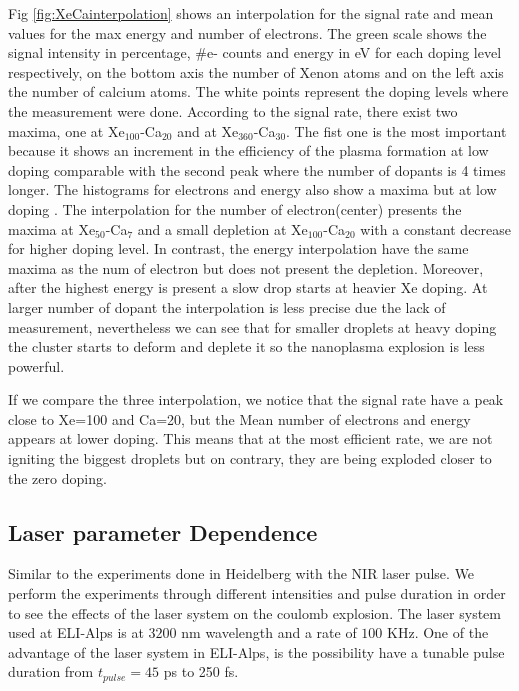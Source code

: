 Fig \ref{fig:XeCainterpolation} shows an interpolation for the signal rate and mean values for the max energy and number of electrons. The green scale shows the signal intensity in percentage, $\#$e- counts and  energy in eV for each doping level respectively, on the bottom axis  the number of Xenon atoms and on the left axis the number of calcium atoms. The white points represent the doping levels where the measurement were done. According to the signal rate, there exist two maxima, one at Xe$_{100}$-Ca$_{20}$ and at Xe$_{360}$-Ca$_{30}$. The fist one is the most important because it shows an increment in the efficiency of the plasma formation at low doping comparable with the second peak where the number of dopants is 4 times longer. The histograms for electrons and energy also show a maxima but at low doping . The interpolation for the number of electron(center) presents the maxima at Xe$_{50}$-Ca$_{7}$ and a small depletion at  Xe$_{100}$-Ca$_{20}$ with a constant decrease for higher doping level. In contrast, the energy interpolation have the same maxima as the num of electron but does not present the depletion. Moreover, after the highest energy is present  a slow drop starts at  heavier Xe doping. At larger number of dopant the interpolation is less precise due the lack of measurement, nevertheless we can see that  for smaller droplets at heavy doping the cluster starts to deform and deplete it so the nanoplasma explosion is  less powerful.

If we compare the three interpolation, we notice that the signal rate have a peak close to Xe=100 and Ca=20, but the Mean number of electrons and energy appears at lower doping. This means that at the most efficient rate, we are not igniting the biggest droplets but on contrary, they are being exploded closer to the zero doping.



\subsection{Laser parameter Dependence}

Similar to the experiments done in Heidelberg with the NIR laser pulse. We perform the experiments through different intensities and pulse duration in order to see the effects of the laser system on the coulomb explosion. The laser system used at ELI-Alps is at $3200$ nm wavelength and a rate of $100$ KHz.  One of the advantage of the laser system in ELI-Alps, is the possibility have a tunable pulse duration from $t_{pulse}=45$ ps to 250 fs.

